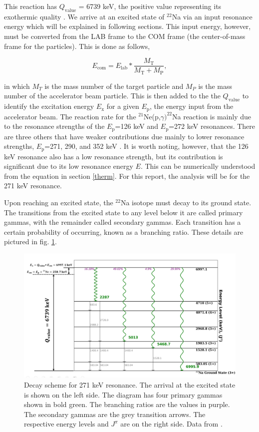 \documentclass[a4paper,12pt]{article}
\def\reac{$^{21}$Ne(p,$\gamma)^{22}$Na reaction }
\begin{document}
    This reaction has $Q_{\text{value}}$ = 6739 keV, the positive value representing its exothermic quality \cite{krane1988}.  We arrive at an excited state of $^{22}$Na via an input resonance energy which will be explained in following sections.  This input energy, however, must be converted from the LAB frame to the COM frame (the center-of-mass frame for the particles).  This is done as follows,

    \[E_{\text{com}} = E_{\text{lab}} * \frac{M_{\text{T}}}{M_{\text{T}} + M_{\text{P}}},\]

    in which $M_T$ is the mass number of the target particle and $M_P$ is the mass number of the accelerator beam particle.  This is then added to the the $Q_{\text{value}}$ to identify the excitation energy $E_{\text{x}}$ for a given $E_{\text{p}}$, the energy input from the accelerator beam.  The reaction rate for the \reac is mainly due to the resonance strengths of the $E_{\text{p}}$=126 keV and $E_{\text{p}}$=272 keV resonances.  There are three others that have weaker contributions due mainly to lower resonance strengths, $E_{\text{p}}$=271, 290, and 352 keV \cite{GORRES1983372}.  It is worth noting, however, that the 126 keV resonance also has a low resonance strength, but its contribution is significant due to its low resonance energy $E$.  This can be numerically understood from the equation in section \ref{therm}.  For this report, the analysis will be for the 271 keV resonance. 

    Upon reaching an excited state, the $^{22}$Na isotope must decay to its ground state.  The transitions from the excited state to any level below it are called primary gammas, with the remainder called secondary gammas.  Each transition has a certain probability of occurring, known as a branching ratio.  These details are pictured in fig. \ref{fig:reac}.  

    \begin{figure}[H]
        \centering
        \includegraphics[width=15cm]{reac.png}
        \caption{Decay scheme for 271 keV resonance.  The arrival at the excited state is shown on the left side. 
 The diagram has four primary gammas shown in bold green.  The branching ratios are the values in purple.  The secondary gammas are the grey transition arrows.  The respective energy levels and $J^{\pi}$ are on the right side. Data from \cite{NNDCNuDat22Na}.}
        \label{fig:reac}
    \end{figure}
\end{document}
